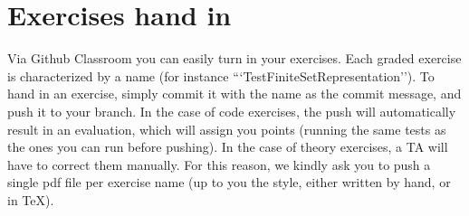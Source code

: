 \section{Exercises hand in}\label{sec:handin_instructions}
Via Github Classroom you can easily turn in your exercises. Each graded exercise is characterized by a name (for instance ```TestFiniteSetRepresentation'').
To hand in an exercise, simply commit it with the name as the commit message, and push it to your branch.
In the case of code exercises, the push will automatically result in an evaluation, which will assign you points (running the same tests as the ones you can run before pushing).
In the case of theory exercises, a TA will have to correct them manually. For this reason, we kindly ask you to push a single pdf file per exercise name (up to you the style, either written by hand, or in TeX).